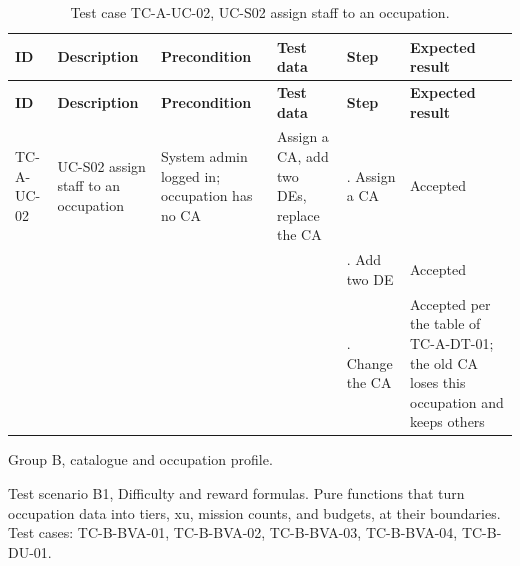 {\footnotesize{}\renewcommand{\arraystretch}{1.1}
\begin{longtable}{|>{\raggedright\arraybackslash}p{}|>{\raggedright\arraybackslash}p{}|>{\raggedright\arraybackslash}p{}|>{\raggedright\arraybackslash}p{}|>{\raggedright\arraybackslash}p{}|>{\raggedright\arraybackslash}p{}|}
\caption{Test case TC-A-UC-02, UC-S02 assign staff to an occupation.} \\
\hline
\textbf{ID} & \textbf{Description} & \textbf{Precondition} & \textbf{Test data} & \textbf{Step} & \textbf{Expected result} \\ \hline
\endfirsthead
\hline
\textbf{ID} & \textbf{Description} & \textbf{Precondition} & \textbf{Test data} & \textbf{Step} & \textbf{Expected result} \\ \hline
\endhead
TC-A-UC-02 & UC-S02 assign staff to an occupation & System admin logged in; occupation has no CA & Assign a CA, add two DEs, replace the CA & 1. Assign a CA & Accepted \\ \cline{5-6}
 &  &  &  & 2. Add two DE & Accepted \\ \cline{5-6}
 &  &  &  & 3. Change the CA & Accepted per the table of TC-A-DT-01; the old CA loses this occupation and keeps others \\ \hline
\end{longtable}
}

Group B, catalogue and occupation profile.

Test scenario B1, Difficulty and reward formulas. Pure functions that turn occupation data into tiers, xu, mission counts, and budgets, at their boundaries. Test cases: TC-\allowbreak{}B-\allowbreak{}BVA-\allowbreak{}01, TC-\allowbreak{}B-\allowbreak{}BVA-\allowbreak{}02, TC-\allowbreak{}B-\allowbreak{}BVA-\allowbreak{}03, TC-\allowbreak{}B-\allowbreak{}BVA-\allowbreak{}04, TC-B-DU-01.

